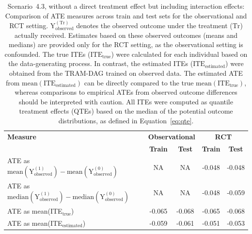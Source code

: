 \begin{table}[htbp]
\centering
\small
\caption{Scenario~4.3, without a direct treatment effect but including interaction effects: Comparison of ATE measures across train and test sets for the observational and RCT setting.  $\text{Y}_\text{observed}^{(\text{Tr})}$ denotes the observed outcome under the treatment ($\text{Tr}$) actually received. Estimates based on these observed outcomes (means and medians) are provided only for the RCT setting, as the observational setting is confounded. The true ITEs ($\text{ITE}_\text{true}$) were calculated for each individual based on the data-generating process. In contrast, the estimated ITEs ($\text{ITE}_\text{estimated}$) were obtained from the TRAM-DAG trained on observed data. The estimated ATE from $\text{mean}(\text{ITE}_\text{estimated})$ can be directly compared to the true $\text{mean}(\text{ITE}_\text{true})$, whereas comparisons to empirical ATEs from observed outcome differences should be interpreted with caution. All ITEs were computed as quantile treatment effects (QTEs) based on the median of the potential outcome distributions, as defined in Equation~\ref{eq:qte}.}
\label{tab:scenario3_ate_comparison}
\begin{tabular}{l c c c c}
\toprule
\textbf{Measure} & \multicolumn{2}{c}{\textbf{Observational}} & \multicolumn{2}{c}{\textbf{RCT}} \\
\cmidrule(lr){2-3} \cmidrule(lr){4-5}
 & \textbf{Train} & \textbf{Test} & \textbf{Train} & \textbf{Test} \\
\midrule
ATE as $\text{mean}(\text{Y}_\text{observed}^{(1)}) - \text{mean}(\text{Y}_\text{observed}^{(0)})$ 
& NA & NA 
& -0.048 
& -0.048 \\

ATE as $\text{median}(\text{Y}_\text{observed}^{(1)}) - \text{median}(\text{Y}_\text{observed}^{(0)})$  
& NA & NA 
& -0.048 
& -0.059 \\

ATE as mean(ITE$_\text{true}$)  
& -0.065 
& -0.068 
& -0.065 
& -0.068 \\

ATE as mean(ITE$_\text{estimated}$) 
& -0.059 
& -0.061 
& -0.051 
& -0.053 \\
\bottomrule
\end{tabular}
\end{table}


